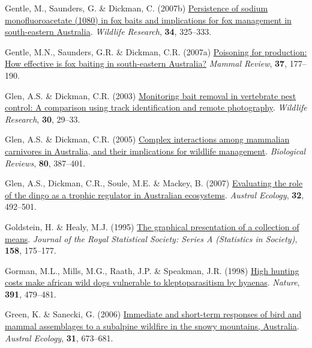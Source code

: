 \documentclass[11pt,a4paper,titlepage,twoside,openright]{style/unimelbthesis}
\newenvironment{CSLReferences}%
  {}%
  {\par}
\begin{document}
\begin{mainmatter}
\begin{CSLReferences}{1}{0}
\leavevmode{}%
Gentle, M., Saunders, G. \& Dickman, C. (2007b) \href{https://doi.org/10.1071/WR06163}{Persistence of sodium monofluoroacetate (1080) in fox baits and implications for fox management in south-eastern {A}ustralia}. \emph{Wildlife Research}, \textbf{34}, 325--333.

\leavevmode{}%
Gentle, M.N., Saunders, G.R. \& Dickman, C.R. (2007a) \href{https://doi.org/10.1111/j.1365-2907.2007.00107.x}{Poisoning for production: How effective is fox baiting in south-eastern {A}ustralia?} \emph{Mammal Review}, \textbf{37}, 177--190.

\leavevmode{}%
Glen, A.S. \& Dickman, C.R. (2003) \href{https://doi.org/10.1071/WR01059}{Monitoring bait removal in vertebrate pest control: A comparison using track identification and remote photography}. \emph{Wildlife Research}, \textbf{30}, 29--33.

\leavevmode{}%
Glen, A.S. \& Dickman, C.R. (2005) \href{https://doi.org/10.1017/S1464793105006718}{Complex interactions among mammalian carnivores in {{A}ustralia}, and their implications for wildlife management}. \emph{Biological Reviews}, \textbf{80}, 387--401.

\leavevmode{}%
Glen, A.S., Dickman, C.R., Soule, M.E. \& Mackey, B. (2007) \href{https://doi.org/10.1111/j.1442-9993.2007.01721.x}{Evaluating the role of the dingo as a trophic regulator in {A}ustralian ecosystems}. \emph{Austral Ecology}, \textbf{32}, 492--501.

\leavevmode{}%
Goldstein, H. \& Healy, M.J. (1995) \href{https://doi.org/10.2307/2983411}{The graphical presentation of a collection of means}. \emph{Journal of the Royal Statistical Society: Series A (Statistics in Society)}, \textbf{158}, 175--177.

\leavevmode{}%
Gorman, M.L., Mills, M.G., Raath, J.P. \& Speakman, J.R. (1998) \href{https://doi.org/10.1038/35131}{High hunting costs make african wild dogs vulnerable to kleptoparasitism by hyaenas}. \emph{Nature}, \textbf{391}, 479--481.

\leavevmode{}%
Green, K. \& Sanecki, G. (2006) \href{https://doi.org/10.1111/j.1442-9993.2006.01629.x}{Immediate and short-term responses of bird and mammal assemblages to a subalpine wildfire in the snowy mountains, {A}ustralia}. \emph{Austral Ecology}, \textbf{31}, 673--681.


\end{CSLReferences}
\end{mainmatter}
\end{document}

